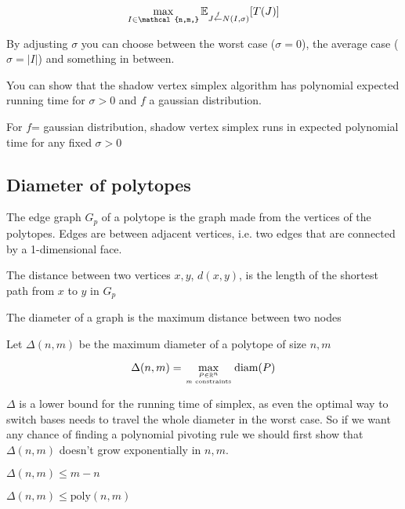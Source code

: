 \[\max_{I\in \mathcal{n,m,}} \E_{J\stackrel{f}{\leftarrow} N(I,\sigma)} [T(J)]\]

By adjusting $\sigma$ you can choose between the worst case ($\sigma=0$), the average case ($\sigma = |I|$) and something in between.

You can show that the shadow vertex simplex algorithm has polynomial expected running time for $\sigma>0$ and $f$ a gaussian distribution.

\begin{thm}[Spielmann '01] For $f$= gaussian distribution, shadow vertex simplex runs in expected polynomial time for any fixed $\sigma>0$
\end{thm}

\subsection{Diameter of polytopes}

\begin{Def} The edge graph $G_p$ of a polytope is the graph made from the vertices of the polytopes. Edges are between adjacent vertices, i.e. two edges that are connected by a 1-dimensional face.
\end{Def}

\begin{Def} The distance between two vertices $x,y$, $d(x,y)$, is the length of the shortest path from $x$ to $y$ in $G_p$
\end{Def}

\begin{Def} The diameter of a graph is the maximum distance between two nodes\end{Def}

\begin{Def} Let $\Delta(n,m)$ be the maximum diameter of a polytope of size $n,m$

\[\Delta(n,m) = \max_{{P\in \mathbb{R}^n}\atop {m \text{ constraints}}} \text{diam}(P) \]
\end{Def}

$\Delta$ is a lower bound for the running time of simplex, as even the optimal way to switch bases needs to travel the whole diameter in the worst case. So if we want any chance of finding a polynomial pivoting rule we should first show that $\Delta(n,m)$ doesn't grow exponentially in $n,m$. 

\begin{thm} $\Delta(n,m)\leq m-n$\end{thm}
\begin{thm} $\Delta(n,m)\leq \text{poly}(n,m)$\end{thm}

